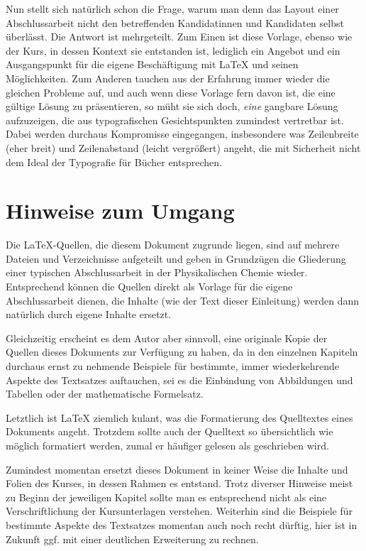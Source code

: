 Nun stellt sich natürlich schon die Frage, warum man denn das Layout einer Abschlussarbeit nicht den betreffenden Kandidatinnen und Kandidaten selbst überlässt. Die Antwort ist mehrgeteilt. Zum Einen ist diese Vorlage, ebenso wie der Kurs, in dessen Kontext sie entstanden ist, lediglich ein Angebot und ein Ausgangspunkt für die eigene Beschäftigung mit \LaTeX{} und seinen Möglichkeiten. Zum Anderen tauchen aus der Erfahrung immer wieder die gleichen Probleme auf, und auch wenn diese Vorlage fern davon ist, die eine gültige Lösung zu präsentieren, so müht sie sich doch, \emph{eine} gangbare Lösung aufzuzeigen, die aus typografischen Gesichtspunkten zumindest vertretbar ist. Dabei werden durchaus Kompromisse eingegangen, insbesondere was Zeilenbreite (eher breit) und Zeilenabstand (leicht vergrößert) angeht, die mit Sicherheit nicht dem Ideal der Typografie für Bücher entsprechen.


\section{Hinweise zum Umgang}

Die \LaTeX{}-Quellen, die diesem Dokument zugrunde liegen, sind auf mehrere Dateien und Verzeichnisse aufgeteilt und geben in Grundzügen die Gliederung einer typischen Abschlussarbeit in der Physikalischen Chemie wieder. Entsprechend können die Quellen direkt als Vorlage für die eigene Abschlussarbeit dienen, die Inhalte (wie der Text dieser Einleitung) werden dann natürlich durch eigene Inhalte ersetzt.

Gleichzeitig erscheint es dem Autor aber sinnvoll, eine originale Kopie der Quellen dieses Dokuments zur Verfügung zu haben, da in den einzelnen Kapiteln durchaus ernst zu nehmende Beispiele für bestimmte, immer wiederkehrende Aspekte des Textsatzes auftauchen, sei es die Einbindung von Abbildungen und Tabellen oder der mathematische Formelsatz.

Letztlich ist \LaTeX{} ziemlich kulant, was die Formatierung des Quelltextes eines Dokuments angeht. Trotzdem sollte auch der Quelltext so übersichtlich wie möglich formatiert werden, zumal er häufiger gelesen als geschrieben wird.

Zumindest momentan ersetzt dieses Dokument in keiner Weise die Inhalte und Folien des Kurses, in dessen Rahmen es entstand. Trotz diverser Hinweise meist zu Beginn der jeweiligen Kapitel sollte man es entsprechend nicht als eine Verschriftlichung der Kursunterlagen verstehen. Weiterhin sind die Beispiele für bestimmte Aspekte des Textsatzes momentan auch noch recht dürftig, hier ist in Zukunft ggf. mit einer deutlichen Erweiterung zu rechnen.


